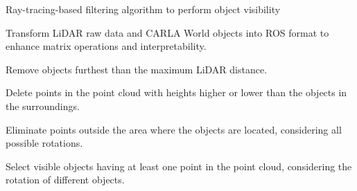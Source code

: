 \begin{comment}
	\BlankLine
	
	\textbf{Function} $f_{\text{visible_{bb}}}(\text{bb}, \text{points})$:\;
	\Indp
	\textbf{return} $\text{np.logical_{and}} \\
	
	(\left( \text{np.logical_{and}} \left( \text{bb}[0] - \frac{\text{bb}[3]}{2} \leq \text{np.array(points[:, 0])}, \\
	\text{np.array(points[:, 0])} \leq \text{bb}[0] + \frac{\text{bb}[3]}{2} \right), \\
	\text{bb}[1] - \frac{\text{bb}[4]}{2} \leq \text{np.array(points[:, 1])} \right), \\
	\left( \text{np.logical_{and}} \left(\text{np.array(points[:, 1])} \leq \text{bb}[1] + \frac{\text{bb}[4]}{2} \right), \\
	\text{bb}[2] - \frac{\text{bb}[5]}{2} \leq \text{np.array(points[:, 2])}, \\
	\text{bb}[2] \leq \frac{\text{bb}[5]}{2})) $\;
	\Indm
	
	\BlankLine
	
	5. Select visible objects having at least one point in the point cloud, considering the rotation of different objects;
	
	\BlankLine
	
	$n_{\text{points\_in\_bb}} = 0$\;
	
	\If{\text{pointcloud is not None}}{
		$points\_in\_bb = f_{\text{visible\_bb}} \left( (\text{obj.position\_x}, \text{obj.position\_y}, \\ \text{obj.position\_z}, \text{obj.l}, \text{obj.w}, \text{obj.h}), \\
		\text{self.pointcloud} \right)$\;
		$n_{\text{points\_in\_bb}} = \text{np.add.reduce}(points\_in\_bb)$\;
	}
\end{comment}

\begin{algorithm}[h]
	\SetAlgoLined
	
	\caption{Ray-tracing-based filtering algorithm to perform object visibility}
	\label{alg:8_ray_tracing_object_visibility}
	
	\BlankLine
	
	Transform \ac{LiDAR} raw data and CARLA World objects into \ac{ROS} format to enhance matrix operations and interpretability.
	
	Remove objects furthest than the maximum \ac{LiDAR} distance.
	
	Delete points in the point cloud with heights higher or lower than the objects in the surroundings.
	
	Eliminate points outside the area where the objects are located, considering all possible rotations.

	Select visible objects having at least one point in the point cloud, considering the rotation of different objects.

\end{algorithm}

